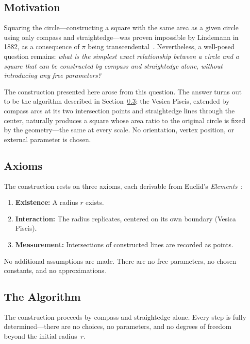 \documentclass[12pt, a4paper]{article}
\begin{document}
\subsection{Motivation}

Squaring the circle---constructing a square with the same area as a given circle using only compass and straightedge---was proven impossible by Lindemann in 1882, as a consequence of $\pi$ being transcendental~\cite{lindemann}. Nevertheless, a well-posed question remains: \emph{what is the simplest exact relationship between a circle and a square that can be constructed by compass and straightedge alone, without introducing any free parameters?}

The construction presented here arose from this question. The answer turns out to be the algorithm described in Section~\ref{sec:algorithm}: the Vesica Piscis, extended by compass arcs at its two intersection points and straightedge lines through the center, naturally produces a square whose area ratio to the original circle is fixed by the geometry---the same at every scale. No orientation, vertex position, or external parameter is chosen.

\subsection{Axioms}

The construction rests on three axioms, each derivable from Euclid's \textit{Elements}~\cite{euclid}:

\begin{enumerate}[label=\textbf{A\arabic*.}]
    \item \textbf{Existence:} A radius $r$ exists.
    \item \textbf{Interaction:} The radius replicates, centered on its own boundary (Vesica Piscis).
    \item \textbf{Measurement:} Intersections of constructed lines are recorded as points.
\end{enumerate}

No additional assumptions are made. There are no free parameters, no chosen constants, and no approximations.

\subsection{The Algorithm}\label{sec:algorithm}

The construction proceeds by compass and straightedge alone. Every step is fully determined---there are no choices, no parameters, and no degrees of freedom beyond the initial radius~$r$.
\end{document}
